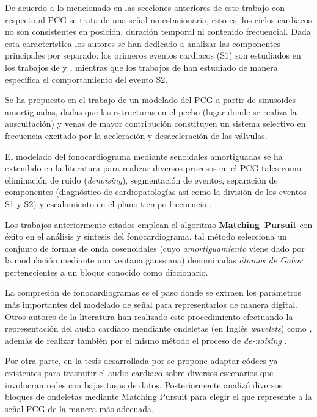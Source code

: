  De acuerdo a lo mencionado en las secciones anteriores de este trabajo con respecto al PCG se trata de una señal no estacionaria, esto es, los ciclos cardiacos no son consistentes en posición, duración temporal ni contenido frecuencial. Dada esta característica los autores se han dedicado a analizar las componentes principales por separado: los primeros eventos cardiacos (S1) son estudiados en los trabajos de \cite{Chen1997,Wood1995} y \cite{Wood1992}, mientras que los trabajos de \cite{Hedayioglu2012,wang04} han estudiado de manera específica el comportamiento del evento S2.
 
 Se ha propuesto en el trabajo de \cite{koymen87} un modelado del PCG a partir de sinusoides amortiguadas, dadas que las estructuras en el pecho (lugar donde se realiza la auscultación) y venas de mayor contribución constituyen un sistema selectivo en frecuencia excitado por la aceleración y desaceleración de las válvulas. 
 
 El modelado del fonocardiograma mediante senoidales amortiguadas se ha extendido en la literatura para realizar diversos procesos en el PCG tales como eliminación de ruido (\emph{denoising}), segmentación de eventos, separación de componentes (diagnóstico de cardiopatologías así como la división de los eventos S1 y S2) y escalamiento en el plano tiempo-frecuencia \cite[]{Nieblas2013,Zhang1998b,Zhang1998a,Sava1998}.
 
  Los trabajos anteriormente citados emplean el algoritmo \mbox{\textbf{Matching Pursuit}} \cite[]{Mallat1993} con éxito en el análisis y síntesis del fonocardiograma, tal método selecciona un conjunto de formas de onda cosenoidales (cuyo \emph{amortiguamiento} viene dado por la modulación mediante una ventana gaussiana) denominadas \emph{átomos de Gabor} pertenecientes a un bloque conocido como diccionario. 
   
 La compresión de fonocardiogramas es el paso donde se extraen los parámetros más importantes del modelado de señal para representarlos de manera digital. Otros autores de la literatura han realizado este procedimiento efectuando la representación del audio cardiaco mendiante ondeletas (en Inglés \emph{wavelets}) como \cite{Alajarin2004,Alajarin2005,Martinez-Alajarin2006}, además de realizar también por el mismo método el proceso de \emph{de-noising} \cite[]{Messer2001}. 
 
 Por otra parte, en la tesis desarrollada por \cite{castorena2012} se propone adaptar códecs ya existentes para trasmitir el audio cardiaco sobre diversos escenarios que involucran redes con bajas tasas de datos. Posteriormente \cite{Nieblas2014} analizó diversos bloques de ondeletas mediante Matching Pursuit para elegir el que represente a la señal PCG de la manera más adecuada. 
 
